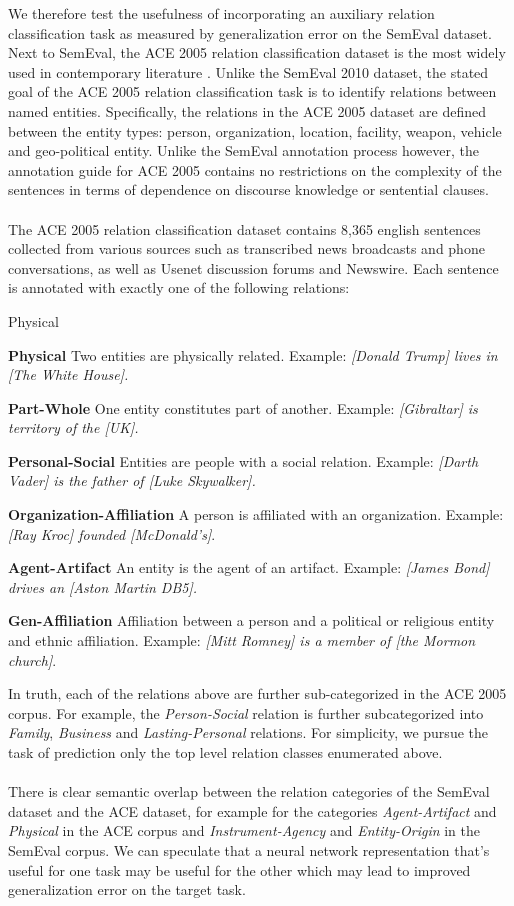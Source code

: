 We therefore test the usefulness of incorporating an auxiliary relation classification task as measured by generalization error on the SemEval dataset. Next to SemEval, the ACE 2005 relation classification dataset is the most widely used in contemporary literature  \citep{walker2006}. Unlike the SemEval 2010 dataset, the stated goal of the ACE 2005 relation classification task is to identify relations between named entities. Specifically, the relations in the ACE 2005 dataset are defined between the entity types: person, organization, location, facility, weapon, vehicle and geo-political entity. Unlike the SemEval annotation process however, the annotation guide for ACE 2005  contains no restrictions on the complexity of the sentences in terms of dependence on discourse knowledge or sentential clauses.
\\\\
The ACE 2005 relation classification dataset contains 8,365 english sentences collected from various sources such as transcribed news broadcasts and phone conversations, as well as Usenet discussion forums and Newswire. Each sentence is annotated with exactly one of the following relations:
\begin{labeling}{Physical}
	\item \textbf{Physical} Two entities are physically related. Example: \textit{[Donald Trump] lives in [The White House].}
	\item \textbf{Part-Whole} One entity constitutes part of another. Example: \textit{[Gibraltar] is territory of the [UK].}
	\item \textbf{Personal-Social} Entities are people with a social relation. Example: \textit{[Darth Vader] is the father of [Luke Skywalker].}
	\item \textbf{Organization-Affiliation} A person is affiliated with an organization. Example: \textit{[Ray Kroc] founded [McDonald's]}.
	\item \textbf{Agent-Artifact} An entity is the agent of an artifact. Example: \textit{[James Bond] drives an [Aston Martin DB5].}
	\item \textbf{Gen-Affiliation} Affiliation between a person and a political or religious entity and ethnic affiliation. Example: \textit{[Mitt Romney] is a member of [the Mormon church]}.
\end{labeling}
In truth, each of the relations above are further sub-categorized in the ACE 2005 corpus. For example, the \textit{Person-Social} relation is further subcategorized into \textit{Family}, \textit{Business} and \textit{Lasting-Personal} relations. For simplicity, we pursue the task of prediction only the top level relation classes enumerated above.
\\\\
There is clear semantic overlap between the relation categories of the SemEval dataset and the ACE dataset, for example for the categories \textit{Agent-Artifact} and \textit{Physical} in the ACE corpus and \textit{Instrument-Agency} and \textit{Entity-Origin} in the SemEval corpus. We can speculate that a neural network representation that's useful for one task may be useful for the other which may lead to improved generalization error on the target task.


